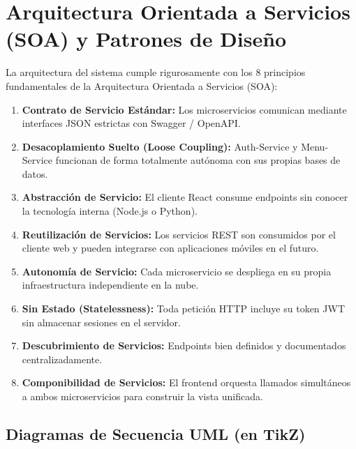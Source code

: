 \documentclass[12pt,a4paper]{article}
\begin{document}
\section{Arquitectura Orientada a Servicios (SOA) y Patrones de Diseño}
La arquitectura del sistema cumple rigurosamente con los 8 principios fundamentales de la Arquitectura Orientada a Servicios (SOA):

\begin{enumerate}[leftmargin=*]
  \item \textbf{Contrato de Servicio Estándar:} Los microservicios comunican mediante interfaces JSON estrictas con Swagger / OpenAPI.
  \item \textbf{Desacoplamiento Suelto (Loose Coupling):} Auth-Service y Menu-Service funcionan de forma totalmente autónoma con sus propias bases de datos.
  \item \textbf{Abstracción de Servicio:} El cliente React consume endpoints sin conocer la tecnología interna (Node.js o Python).
  \item \textbf{Reutilización de Servicios:} Los servicios REST son consumidos por el cliente web y pueden integrarse con aplicaciones móviles en el futuro.
  \item \textbf{Autonomía de Servicio:} Cada microservicio se despliega en su propia infraestructura independiente en la nube.
  \item \textbf{Sin Estado (Statelessness):} Toda petición HTTP incluye su token JWT sin almacenar sesiones en el servidor.
  \item \textbf{Descubrimiento de Servicios:} Endpoints bien definidos y documentados centralizadamente.
  \item \textbf{Componibilidad de Servicios:} El frontend orquesta llamados simultáneos a ambos microservicios para construir la vista unificada.
\end{enumerate}

\subsection{Diagramas de Secuencia UML (en TikZ)}
\end{document}
